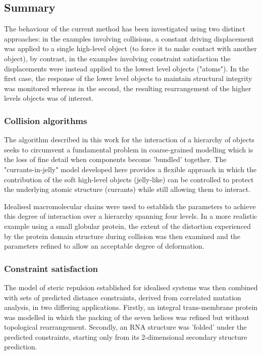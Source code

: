 \subsection{Summary}

The behaviour of the current method has been investigated using two distinct
approaches: in the examples involving collisions, a constant driving displacement
was applied to a single high-level object (to force it to make contact with 
another object), by contrast,  in the examples involving constraint satisfaction the 
displacements were instead applied to the lowest level objects ("atoms").  In the first
case, the response of the lower level objects to maintain structural integrity was monitored
whereas in the second, the resulting rearrangement of the higher levels objects was of interest.

\subsubsection{Collision algorithms}

The algorithm described in this work for the interaction of a hierarchy of objects
seeks to circumvent a fundamental problem in coarse-grained modelling which
is the loss of fine detail when components become 'bundled' together.
The "currants-in-jelly" model developed here provides a flexible approach in which
the contribution of the soft high-level objects (jelly-like) can be controlled
to protect the underlying atomic structure (currants) while still allowing
them to interact.

Idealised macromolecular chains were used to establish the parameters
to achieve this degree of interaction over a hierarchy spanning four levels.
In a more realistic example using a small globular protein, the extent of the 
distortion experienced by the protein domain structure during collision was then 
examined and the parameters refined to allow an acceptable degree of deformation.

\subsubsection{Constraint satisfaction}

The model of steric repulsion established for idealised systems was then
combined with sets of predicted distance constraints, derived from correlated
mutation analysis,  in two differing applications.    Firstly, an integral
trans-membrane protein was modelled in which the packing of the seven
helices was refined but without topological rearrangement.  Secondly,
an RNA structure was 'folded' under the predicted constraints, starting only
from its 2-dimensional secondary structure prediction.

